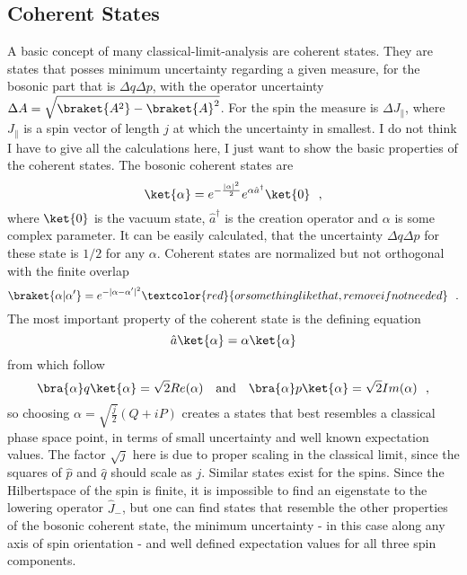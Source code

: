 \subsection{Coherent States}\label{ch:CoherentStates}
A basic concept of many classical-limit-analysis are coherent states.
They are states that posses minimum uncertainty regarding a given measure, for the bosonic part that is $\Delta q \Delta p$, with the operator uncertainty $\Delta A = \sqrt{\braket{A^2} - \braket{A}^2}$.
For the spin the measure is $\Delta J_\parallel$, where $J_\parallel$ is a spin vector of length $j$ at which the uncertainty in smallest.
I do not think I have to give all the calculations here, I just want to show the basic properties of the coherent states.
The bosonic coherent states are
\begin{equation}
	\ket{\alpha} = e^{-\frac{|\alpha|^2}{2}} e^{\alpha \hat a^\dagger}\ket{0}~~,
\end{equation}
where $\ket{0}$ is the vacuum state, $\hat a^\dagger$ is the creation operator and $\alpha$ is some complex parameter. 
It can be easily calculated, that the uncertainty $\Delta q \Delta p$ for these state is $1/2$ for any $\alpha$.
Coherent states are normalized but not orthogonal with the finite overlap
\begin{equation}
	\braket{\alpha| \alpha'} = e^{-|\alpha - \alpha'|^2} \textcolor{red}{or something like that, remove if not needed}~~.
\end{equation}
The most important property of the coherent state is the defining equation
\begin{equation}
	\hat{a} \ket{\alpha} = \alpha \ket{\alpha}
\end{equation}
from which follow 
\begin{equation}
	\bra{\alpha} q \ket{\alpha} = \sqrt{2} Re(\alpha) ~~~\text{and} ~~~ 	\bra{\alpha} p \ket{\alpha} =  \sqrt{2} Im(\alpha)~~,
\end{equation}
so choosing $\alpha = \sqrt{\frac{j}{2}}(Q + i P)$ creates a states that best resembles a classical phase space point, in terms of small uncertainty and well known expectation values.
The factor $\sqrt{j}$ here is due to proper scaling in the classical limit, since the squares of $\hat p$ and $\hat q$ should scale as $j$.
Similar states exist for the spins.
Since the Hilbertspace of the spin is finite, it is impossible to find an eigenstate to the lowering operator $\hat J_-$, but one can find states that resemble the other properties of the bosonic coherent state, the minimum uncertainty - in this case along any axis of spin orientation - and well defined expectation values for all three spin components.
